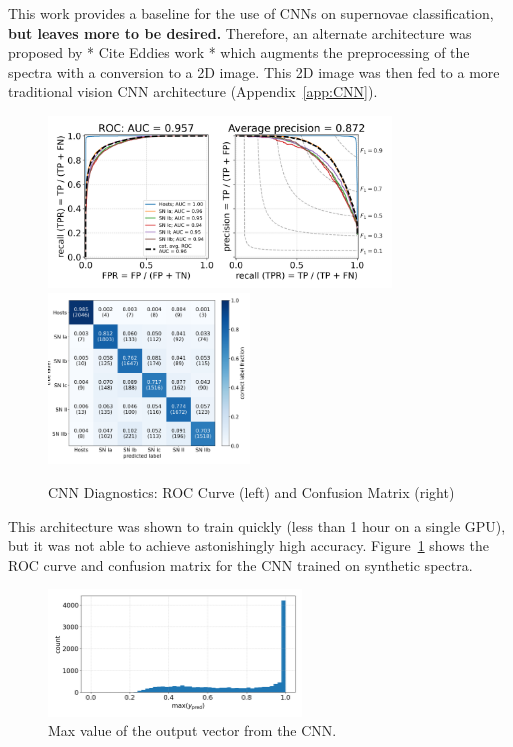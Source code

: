 This work provides a baseline for the use of CNNs on supernovae classification, 
\textbf{but leaves more to be desired.} Therefore, an alternate architecture was proposed 
by * Cite Eddies work * which augments the preprocessing of the spectra with 
a conversion to a 2D image. This 2D image was then fed to a more traditional vision 
CNN architecture (Appendix~\ref{app:CNN}). 
\begin{figure}[t]
    \centering
    \includegraphics[height=4.55cm]{figures/cnn/cnn_rocfull.png}
    \quad
    \includegraphics[height=4.55cm]{figures/cnn/cnn_cmfull.png}
    \caption[CNN diagnostics]{CNN Diagnostics: ROC Curve (left) and Confusion Matrix (right)\label{fig:cnn_qual}}
\end{figure}
This architecture was shown to train quickly (less than 1 hour on a single GPU), 
but it was not able to achieve astonishingly high accuracy. Figure~\ref{fig:cnn_qual}
shows the ROC curve and confusion matrix for the CNN trained on synthetic spectra. 
\begin{figure}[b]
    \centering
    \includegraphics[width=0.6\textwidth]{figures/cnn/cnn_max_ypred.png}
    \caption[CNN's Confidence in Classification]{Max value of the output vector from the CNN.\label{fig:cnn_max}}
\end{figure}


